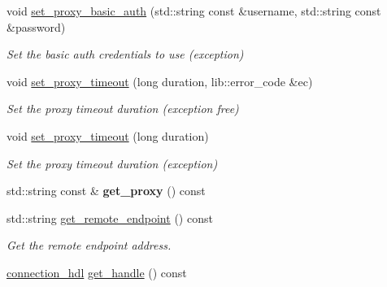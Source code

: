 \begin{DoxyCompactItemize}
void \mbox{\hyperlink{classwebsocketpp_1_1transport_1_1asio_1_1connection_a0a42cbcc12974d71c0ea91d12da6b72e}{set\+\_\+proxy\+\_\+basic\+\_\+auth}} (std\+::string const \&username, std\+::string const \&password)
\begin{DoxyCompactList}\small\item\em Set the basic auth credentials to use (exception) \end{DoxyCompactList}\item 
void \mbox{\hyperlink{classwebsocketpp_1_1transport_1_1asio_1_1connection_a1617e51dd915164bd80d0a24b19e7763}{set\+\_\+proxy\+\_\+timeout}} (long duration, lib\+::error\+\_\+code \&ec)
\begin{DoxyCompactList}\small\item\em Set the proxy timeout duration (exception free) \end{DoxyCompactList}\item 
\mbox{\label{classwebsocketpp_1_1transport_1_1asio_1_1connection_a01368cd677c09dfb7e47261180ebba82}} 
void \mbox{\hyperlink{classwebsocketpp_1_1transport_1_1asio_1_1connection_a01368cd677c09dfb7e47261180ebba82}{set\+\_\+proxy\+\_\+timeout}} (long duration)
\begin{DoxyCompactList}\small\item\em Set the proxy timeout duration (exception) \end{DoxyCompactList}\item 
\mbox{\label{classwebsocketpp_1_1transport_1_1asio_1_1connection_a302c81fe0bb6fd86b8860109adc363c7}} 
std\+::string const  \& {\bfseries get\+\_\+proxy} () const
\item 
std\+::string \mbox{\hyperlink{classwebsocketpp_1_1transport_1_1asio_1_1connection_ac16d6ae60ee14176130dc92d12a30b61}{get\+\_\+remote\+\_\+endpoint}} () const
\begin{DoxyCompactList}\small\item\em Get the remote endpoint address. \end{DoxyCompactList}\item 
\mbox{\label{classwebsocketpp_1_1transport_1_1asio_1_1connection_af9931e0ac551bc307ca7d16061484998}} 
\mbox{\hyperlink{namespacewebsocketpp_a6b3d26a10ee7229b84b776786332631d}{connection\+\_\+hdl}} \mbox{\hyperlink{classwebsocketpp_1_1transport_1_1asio_1_1connection_af9931e0ac551bc307ca7d16061484998}{get\+\_\+handle}} () const

\end{DoxyCompactItemize}
